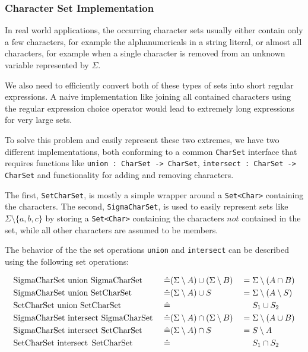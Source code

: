 \subsubsection{Character Set Implementation}

In real world applications, the occurring character sets usually either contain only a few characters, for example the alphanumericals in a string literal, or almost all characters, for example when a single character is removed from an unknown variable represented by $\Sigma$.

We also need to efficiently convert both of these types of sets into short regular expressions. A naive implementation like joining all contained characters using the regular expression choice operator would lead to extremely long expressions for very large sets.

To solve this problem and easily represent these two extremes, we have two different implementations, both conforming to a common \lstinline|CharSet| interface that requires functions like \lstinline|union : CharSet -> CharSet|, \lstinline|intersect : CharSet -> CharSet| and functionality for adding and removing characters.

The first, \lstinline|SetCharSet|, is mostly a simple wrapper around a \lstinline|Set<Char>| containing the characters.
The second, \lstinline|SigmaCharSet|, is used to easily represent sets like $\Sigma \setminus \{a, b, c\}$ by storing a \lstinline|Set<Char>| containing the characters $not$ contained in the set, while all other characters are assumed to be members.

The behavior of the the set operations \lstinline|union| and \lstinline|intersect| can be described using the following set operations:

\noindent
\begin{alignat*}{3}
	& \text{\lstinline|SigmaCharSet union SigmaCharSet| } && \hat{=} (\Sigma \setminus A) \cup (\Sigma \setminus B) & &= \Sigma \setminus (A \cap B) \\
	& \text{\lstinline|SigmaCharSet union SetCharSet| } && \hat{=} (\Sigma \setminus A) \cup S & &= \Sigma \setminus (A \setminus S) \\
	& \text{\lstinline|SetCharSet union SetCharSet| } && \hat{=} & &\phantom{{}={}} S_1 \cup S_2 \\
	& \text{\lstinline|SigmaCharSet intersect SigmaCharSet| } && \hat{=} (\Sigma \setminus A) \cap (\Sigma \setminus B) & &= \Sigma \setminus (A \cup B) \\
	& \text{\lstinline|SigmaCharSet intersect SetCharSet| } && \hat{=} (\Sigma \setminus A) \cap S & &= S \setminus A \\
	& \text{\lstinline|SetCharSet intersect SetCharSet| } && \hat{=} & &\phantom{{}={}} S_1 \cap S_2
\end{alignat*}

